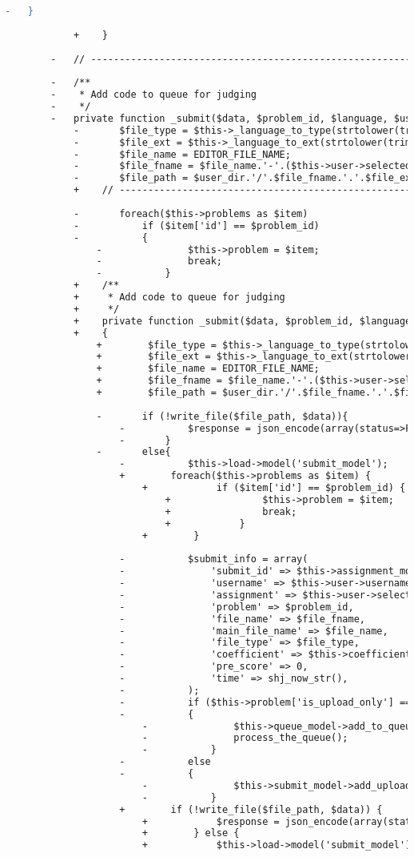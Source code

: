 \begin{lstlisting}[language=diff, caption=Perubahan pada kode Submit.php]
				-	}
			
			+    }
		
		-	// ------------------------------------------------------------------------
		
		-	/**
		-	 * Add code to queue for judging
		-	 */
		-	private function _submit($data, $problem_id, $language, $user_dir){
			-		$file_type = $this->_language_to_type(strtolower(trim($language)));
			-		$file_ext = $this->_language_to_ext(strtolower(trim($language)));
			-		$file_name = EDITOR_FILE_NAME;
			-		$file_fname = $file_name.'-'.($this->user->selected_assignment['total_submits']+1);
			-		$file_path = $user_dir.'/'.$file_fname.'.'.$file_ext;
			+    // ------------------------------------------------------------------------
			
			-		foreach($this->problems as $item)
			-			if ($item['id'] == $problem_id)
			-			{
				-				$this->problem = $item;
				-				break;
				-			}
			+    /**
			+     * Add code to queue for judging
			+     */
			+    private function _submit($data, $problem_id, $language, $user_dir)
			+    {
				+        $file_type = $this->_language_to_type(strtolower(trim($language)));
				+        $file_ext = $this->_language_to_ext(strtolower(trim($language)));
				+        $file_name = EDITOR_FILE_NAME;
				+        $file_fname = $file_name.'-'.($this->user->selected_assignment['total_submits'] + 1);
				+        $file_path = $user_dir.'/'.$file_fname.'.'.$file_ext;
				
				-		if (!write_file($file_path, $data)){
					-			$response = json_encode(array(status=>FALSE, message=>'Unable to submit'));
					-		}
				-		else{
					-			$this->load->model('submit_model');
					+        foreach($this->problems as $item) {
						+            if ($item['id'] == $problem_id) {
							+                $this->problem = $item;
							+                break;
							+            }
						+        }
					
					-			$submit_info = array(
					-				'submit_id' => $this->assignment_model->increase_total_submits($this->user->selected_assignment['id']),
					-				'username' => $this->user->username,
					-				'assignment' => $this->user->selected_assignment['id'],
					-				'problem' => $problem_id,
					-				'file_name' => $file_fname,
					-				'main_file_name' => $file_name,
					-				'file_type' => $file_type,
					-				'coefficient' => $this->coefficient,
					-				'pre_score' => 0,
					-				'time' => shj_now_str(),
					-			);
					-			if ($this->problem['is_upload_only'] == 0)
					-			{
						-				$this->queue_model->add_to_queue($submit_info);
						-				process_the_queue();
						-			}
					-			else
					-			{
						-				$this->submit_model->add_upload_only($submit_info);
						-			}
					+        if (!write_file($file_path, $data)) {
						+            $response = json_encode(array(status => false, message => 'Unable to submit'));
						+        } else {
						+            $this->load->model('submit_model');
						

\end{lstlisting}
